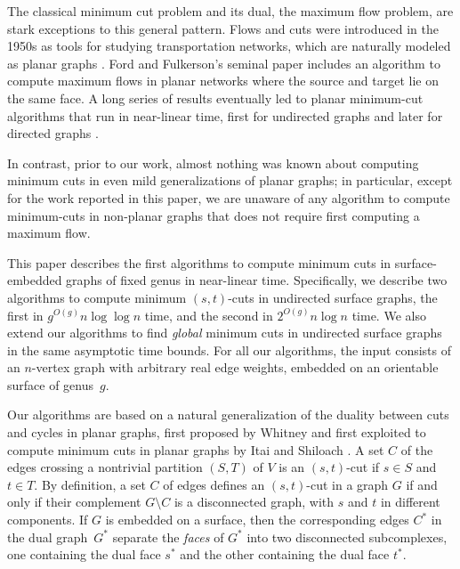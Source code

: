 \documentclass[letterpaper,review]{siamart190516}
\def\modified#1{\color{blue}#1 \color{black}}
\begin{document}
The classical minimum cut problem and its dual, the maximum flow problem, are stark exceptions to this general pattern.  Flows and cuts were introduced in the 1950s as tools for studying transportation networks, which are naturally modeled as planar graphs \cite{hr-fmern-55}.  Ford and Fulkerson's seminal paper \cite{ff-mfn-56} includes an algorithm to compute maximum flows in planar networks where the source and target lie on the same face.  A long series of results eventually led to planar minimum-cut algorithms that run in near-linear time, first for undirected graphs \cite{r-mstcp-83, hj-oamfu-85, f-faspp-87, insw-iamcmf-11} and later for directed graphs \cite{jk-mcdpn-92, hkrs-fspap-97, mnnw-mdpgo-15}.

In contrast, prior to our work, almost nothing was known about computing minimum cuts in even mild generalizations of planar graphs; in particular, except for the work reported in this paper, we are unaware of any algorithm to compute minimum-cuts in non-planar graphs that does not require first computing a maximum flow.  

This paper describes the first algorithms to compute minimum cuts in surface-embedded graphs of fixed genus in near-linear time.  Specifically, we describe two algorithms to compute minimum $(s,t)$-cuts in undirected surface graphs, the first in $g^{O(g)} n\log\log n$ time, and the second in $2^{O(g)} n\log n$ time.
We also extend our  algorithms to find \emph{global} minimum cuts in undirected surface graphs in the same asymptotic time bounds.  For all our algorithms, the input consists of an $n$-vertex graph with arbitrary real edge weights, embedded on an orientable surface of genus~$g$.

Our algorithms are based on a natural generalization of the duality between cuts and cycles in planar graphs, first proposed by Whitney \cite{w-pg-33} and first exploited to compute minimum cuts in planar graphs by Itai and Shiloach \cite{is-mfpn-79}. \modified{A set $C$ of the edges crossing a nontrivial partition $(S,T)$ of $V$ is an $(s,t)$-cut if $s\in S$ and $t \in T$. } By definition, a set $C$ of edges defines an $(s,t)$-cut in a graph $G$ if and only if their complement $G\setminus C$ is a disconnected graph, with $s$ and $t$ in different components.  If $G$ is embedded on a surface, then the corresponding edges $C^*$ in the dual graph~$G^*$ separate the \emph{faces} of $G^*$ into two disconnected subcomplexes, one containing the dual face $s^*$ and the other containing the dual face $t^*$. 
\end{document}

